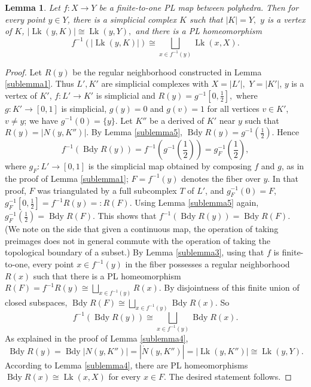 \documentclass{amsart}
\newtheorem{lemma}[thm]{Lemma}
\theoremstyle{definition}
\theoremstyle{remark}
\newcommand {\smlhf} {\ensuremath{\mbox{$\frac{1}{2}$}}}
\newcommand {\Bdy}    {{\ensuremath{\operatorname{Bdy}}}}
\newcommand {\Lk}    {{\ensuremath{\operatorname{Lk}}}}
\begin{document}
\begin{lemma} \label{lem.preimageoflink}
Let $f: X\to Y$ be a finite-to-one PL map between polyhedra.
Then for every point $y\in Y$, there is 
a simplicial complex $K$ such that 
$|K|=Y,$ $y$ is a vertex of $K$, 
$|\Lk (y,K)| \cong \Lk (y,Y),$ and there is
a PL homeomorphism
\[ f^{-1} (|\Lk (y,K)|) \cong \bigsqcup_{x\in f^{-1} (y)} \Lk (x,X). \]
\end{lemma}
\begin{proof}
Let $R(y)$ be the regular neighborhood constructed in Lemma \ref{sublemma1}.
Thus $L', K'$ are simplicial complexes with $X=|L'|,$ $Y=|K'|$,
$y$ is a vertex of $K'$,
$f: L' \to K'$ is simplicial and $R(y) = g^{-1} [0,\smlhf],$
where $g: K' \to [0,1]$ is simplicial,
$g(y) =0$ and $g(v)=1$ for all vertices $v\in K'$, $v\not= y$;
we have $g^{-1} (0) = \{ y \}.$
Let $K''$ be a derived of $K'$ near $y$ such that
$R(y)=|N(y,K'')|$.
By Lemma \ref{sublemma5},
$\Bdy R(y) = g^{-1} (\smlhf).$ Hence
\[
f^{-1} (\Bdy R(y))
 = f^{-1} (g^{-1} (\smlhf))
 = g_F^{-1} (\smlhf),
\]
where $g_F: L' \to [0,1]$ is the simplicial map obtained by composing
$f$ and $g$, as in the proof of Lemma \ref{sublemma1};
$F = f^{-1} (y)$ denotes the fiber over $y$.
In that proof, 
$F$ was triangulated by a full subcomplex $T$ of $L'$, and
$g_F^{-1} (0) = F$, $g_F^{-1} [0,\smlhf] = f^{-1} R(y) =: R(F)$.
Using Lemma \ref{sublemma5} again,
$g_F^{-1} (\smlhf) = \Bdy R(F).$
This shows that
$f^{-1} (\Bdy R(y)) = \Bdy R(F).$
(We note on the side that
given a continuous map, the operation of taking preimages
does not in general commute with the operation of taking
the topological boundary of a subset.)
By Lemma \ref{sublemma3}, using that $f$ is finite-to-one,
every point $x\in f^{-1} (y)$ in the fiber possesses a regular neighborhood
$R(x)$ such that there is a PL homeomorphism
$R(F) = f^{-1} R(y) \cong \bigsqcup_{x\in f^{-1} (y)} R(x).$
By disjointness of this finite union of closed subspaces,
$\Bdy R(F) \cong \bigsqcup_{x\in f^{-1} (y)} \Bdy R(x).$
So
\[ f^{-1} (\Bdy R(y)) \cong \bigsqcup_{x\in f^{-1} (y)} \Bdy R(x). \]
As explained in the proof of Lemma \ref{sublemma4}, 
\[ \Bdy R(y)
 = \Bdy |N(y,K'')| 
 =  |\dot{N} (y,K'')| 
 = |\Lk (y,K'')|
  \cong \Lk (y,Y). \]
According to Lemma \ref{sublemma4}, there are PL homeomorphisms
$\Bdy R(x) \cong \Lk (x,X)$
for every $x\in F.$ 
The desired statement follows.
\end{proof}
\end{document}
